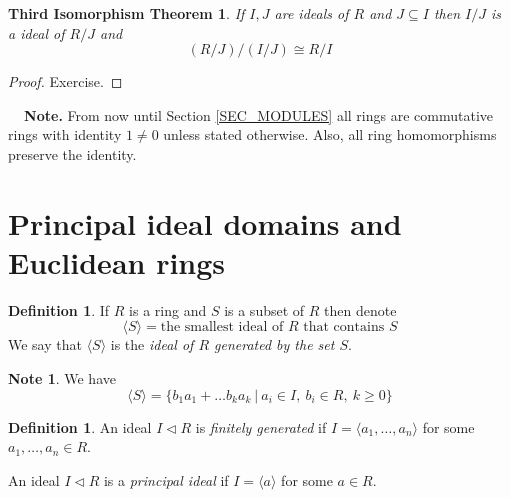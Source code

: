 \documentclass[12pt, letterpaper, oneside]{article}
\theoremstyle{plain}
\newtheorem{TIT}[theorem]{Third Isomorphism Theorem}
\theoremstyle{definition}
\newtheorem{definition}[theorem]{Definition}
\newtheorem{note}[theorem]{Note}
\newcommand{\subgp}[1]{\langle#1\rangle}
\newcommand{\vs}{\vskip 5mm}
\begin{document}
\begin{TIT}
If $I, J$ are ideals of $R$ and $J\subseteq I$ then $I/J$ is a ideal of $R/J$ and 
$$(R/J)/ (I/J) \cong R/I$$
\end{TIT}


\begin{proof} 
Exercise.
\end{proof}




\newpage

\begin{framed}
\textbf{\ \ Note.} From now until Section \ref{SEC_MODULES} 
all rings are commutative rings  with  \newline
{} identity $1\neq 0$ unless stated otherwise. Also, all ring homomorphisms  \newline
{} preserve the identity. 
\end{framed}


\section{Principal ideal domains and Euclidean rings}
\label{SEC_PIDSANDEUCRINGS}


\vs

\begin{definition}
If $R$ is a ring and $S$ is a subset of $R$ then denote
$$\subgp{S} = \text{the smallest ideal of } R \text{ that contains } S$$
We say that $\subgp{S}$ is the \emph{ideal of $R$ generated by the set $S$}.
\end{definition}

\vs\vs

\begin{note}
We have 
$$\subgp{S} = \{b_{1}a_{1}+ \dots b_{k}a_{k} \ | \ a_{i}\in I,\  b_{i}\in R,\  k \geq 0 \}$$
\end{note}


\vs\vs

\begin{definition}
An ideal $I\lhd R$ is \emph{finitely generated} if 
$I = \subgp{a_{1}, \dots, a_{n}}$
for some $a_{1}, \dots, a_{n}\in R$. 

An ideal  $I\lhd R$ is a \emph{principal ideal} if $I = \subgp{a}$ for some $a\in R$.
\end{definition}
\end{document}
